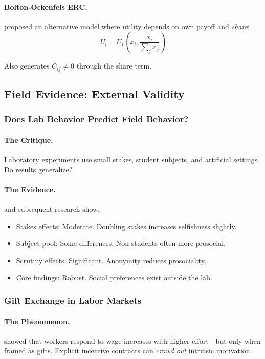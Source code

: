 \documentclass[12pt,a4paper]{article}
\begin{document}
\paragraph{Bolton-Ockenfels ERC.}
\citet{boltonockenfels} proposed an alternative model where utility depends on own payoff and \emph{share}:
\begin{equation}
  U_i = U_i\left(x_i, \frac{x_i}{\sum_j x_j}\right)
\end{equation}

Also generates $C_{ij} \neq 0$ through the share term.

\subsection{Field Evidence: External Validity}

\subsubsection{Does Lab Behavior Predict Field Behavior?}

\paragraph{The Critique.}
Laboratory experiments use small stakes, student subjects, and artificial settings.
Do results generalize?

\paragraph{The Evidence.}
\citet{levittlist2007} and subsequent research show:
\begin{itemize}
  \item Stakes effects: Moderate. Doubling stakes increases selfishness slightly.
  \item Subject pool: Some differences. Non-students often more prosocial.
  \item Scrutiny effects: Significant. Anonymity reduces prosociality.
  \item Core findings: Robust. Social preferences exist outside the lab.
\end{itemize}

\subsubsection{Gift Exchange in Labor Markets}

\paragraph{The Phenomenon.}
\citet{gneezyrustichini2000} showed that workers respond to wage increases
with higher effort---but only when framed as gifts.
Explicit incentive contracts can \emph{crowd out} intrinsic motivation.
\end{document}
